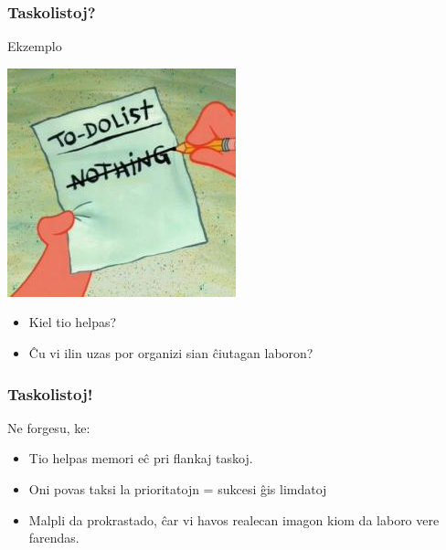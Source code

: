   \begin{frame}
    \frametitle{Taskolistoj?}

	\begin{block}{Ekzemplo}
    	\begin{center}
    	\includegraphics[scale=0.5]{meme/to_do_list}
    	\end{center}
	\end{block}
    
    \begin{itemize}
    	\item Kiel tio helpas?
    	\item Ĉu vi ilin uzas por organizi sian ĉiutagan laboron?
    \end{itemize}
        
  \end{frame}    


   
  \begin{frame}
    \frametitle{Taskolistoj!}
    Ne forgesu, ke:
    \begin{itemize}
    	\item Tio helpas memori eĉ pri flankaj taskoj.
     	\item Oni povas taksi la prioritatojn = sukcesi ĝis limdatoj
        \item Malpli da prokrastado, ĉar vi havos realecan imagon kiom da laboro vere farendas.      
    \end{itemize}
  \end{frame}      


